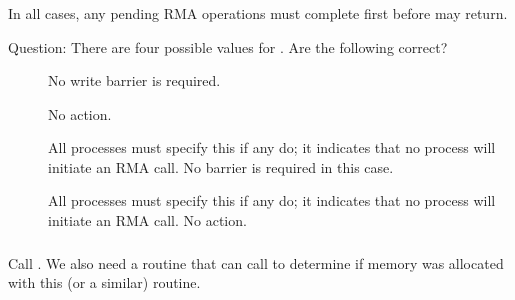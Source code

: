 \documentclass{article}
\begin{document}
\subsubsection{}




In all cases, any pending RMA operations must complete first before
 may return.

Question:  There are four possible  values for
.  Are the following correct?
\begin{description}
\item[]No write barrier is required.
\item[]No action.
\item[]All processes must specify this if any do;
  it 
  indicates that no process will initiate an RMA call.  No barrier is required
  in this case.
\item[]All processes must specify this if any do;
  it indicates that no process will initiate an RMA call.  No action.
\end{description}

\subsubsection{}
Call .  We also need a routine that
 can call to determine if memory was allocated with
this (or a similar) routine.
\end{document}
